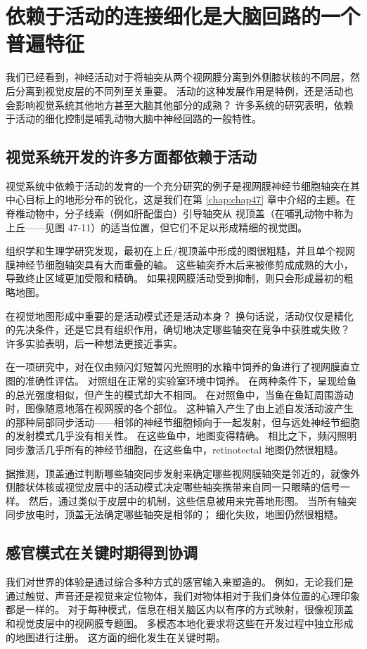 \section{依赖于活动的连接细化是大脑回路的一个普遍特征}
我们已经看到，神经活动对于将轴突从两个视网膜分离到外侧膝状核的不同层，然后分离到视觉皮层的不同列至关重要。 活动的这种发展作用是特例，还是活动也会影响视觉系统其他地方甚至大脑其他部分的成熟？ 许多系统的研究表明，依赖于活动的细化控制是哺乳动物大脑中神经回路的一般特性。

\subsection{视觉系统开发的许多方面都依赖于活动}
视觉系统中依赖于活动的发育的一个充分研究的例子是视网膜神经节细胞轴突在其中心目标上的地形分布的锐化，这是我们在第 \ref{chap:chap47} 章中介绍的主题。在脊椎动物中，分子线索（例如肝配蛋白）引导轴突从 视顶盖（在哺乳动物中称为上丘——见图 47-11）的适当位置，但它们不足以形成精细的视觉图。

组织学和生理学研究发现，最初在上丘/视顶盖中形成的图很粗糙，并且单个视网膜神经节细胞轴突具有大而重叠的轴。 这些轴突乔木后来被修剪成成熟的大小，导致终止区域更加受限和精确。 如果视网膜活动受到抑制，则只会形成最初的粗略地图。

在视觉地图形成中重要的是活动模式还是活动本身？ 换句话说，活动仅仅是精化的先决条件，还是它具有组织作用，确切地决定哪些轴突在竞争中获胜或失败？ 许多实验表明，后一种想法更接近事实。

在一项研究中，对在仅由频闪灯短暂闪光照明的水箱中饲养的鱼进行了视网膜直立图的准确性评估。 对照组在正常的实验室环境中饲养。 在两种条件下，呈现给鱼的总光强度相似，但产生的模式却大不相同。 在对照鱼中，当鱼在鱼缸周围游动时，图像随意地落在视网膜的各个部位。 这种输入产生了由上述自发活动波产生的那种局部同步活动——相邻的神经节细胞倾向于一起发射，但与远处神经节细胞的发射模式几乎没有相关性。 在这些鱼中，地图变得精确。 相比之下，频闪照明同步激活几乎所有的神经节细胞，在这些鱼中，retinotectal 地图仍然很粗糙。

据推测，顶盖通过判断哪些轴突同步发射来确定哪些视网膜轴突是邻近的，就像外侧膝状体核或视觉皮层中的活动模式决定哪些轴突携带来自同一只眼睛的信号一样。 然后，通过类似于皮层中的机制，这些信息被用来完善地形图。 当所有轴突同步放电时，顶盖无法确定哪些轴突是相邻的； 细化失败，地图仍然很粗糙。

\subsection{感官模式在关键时期得到协调}
我们对世界的体验是通过综合多种方式的感官输入来塑造的。 例如，无论我们是通过触觉、声音还是视觉来定位物体，我们对物体相对于我们身体位置的心理印象都是一样的。 对于每种模式，信息在相关脑区内以有序的方式映射，很像视顶盖和视觉皮层中的视网膜专题图。 多模态本地化要求将这些在开发过程中独立形成的地图进行注册。 这方面的细化发生在关键时期。

